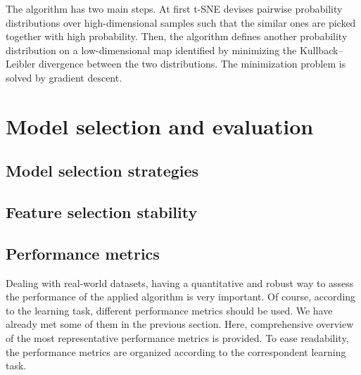 	The algorithm has two main steps. At first t-SNE devises pairwise probability distributions over high-dimensional samples such that the similar ones are picked together with high probability. Then, the algorithm defines another probability distribution on a low-dimensional map identified by minimizing the Kullback–Leibler divergence between the two distributions. The minimization problem is solved by gradient descent. 
    

  \section{Model selection and evaluation} \label{subsec:model_selection}
    \subsection{Model selection strategies}
    \subsection{Feature selection stability}
    \subsection{Performance metrics} \label{sec:performance_metrics}
    Dealing with real-world datasets, having a quantitative and robust way to assess the performance of the applied algorithm is very important. Of course, according to the learning task, different performance metrics should be used. We have already met some of them in the previous section. Here, comprehensive overview of the most representative performance metrics is provided. To ease readability, the performance metrics are organized according to the correspondent learning task.
    
